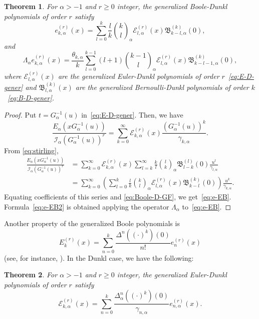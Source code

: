 \documentclass[11pt]{article}
\theoremstyle{plain}
\newtheorem{theorem}{Theorem}[section]
\theoremstyle{remark}
\numberwithin{equation}{section} %
\newcommand{\Ea}{E_{\alpha}}
\newcommand{\La}{\Lambda_{\alpha}}
\newcommand{\binoma}[2]{\binom{#1}{#2}_{\!\alpha}}
\newcommand{\I}{\mathcal{I}}
\newcommand{\B}{\mathfrak{B}}
\newcommand{\E}{\mathcal{E}}
\begin{document}
\begin{theorem}
\label{thm:BD-GED}
For $\alpha>-1$ and $r\ge 0$ integer, the generalized Boole-Dunkl polynomials of order $r$ satisfy
\begin{equation}
\label{eq:e-EB}
  e_{k,\alpha}^{(r)}(x) = \sum_{l=0}^k \frac{l}{k}\binoma{k}{l} 
  \E_{l,\alpha}^{(r)}(x)\B_{k-l,\alpha}^{(k)}(0),
\end{equation}
and
\begin{equation}
\label{eq:e-EB2}
  \La e_{k,\alpha}^{(r)}(x)
  = \frac{\theta_{k,\alpha}}{k} \sum_{l=0}^{k-1} (l+1) \binoma{k-1}{l} 
  \E_{l,\alpha}^{(r)}(x) \B_{k-l-1,\alpha}^{(k)}(0),
\end{equation}
where $\E^{(r)}_{l,\alpha}(x)$ are the generalized Euler-Dunkl polynomials of order $r$~\eqref{eq:E-D-gener} and $\B^{(k)}_{l,\alpha}(x)$ are the generalized Bernoulli-Dunkl polynomials of order $k$~\eqref{eq:B-D-gener}.
\end{theorem}

\begin{proof}
Put $t=G_{\alpha}^{-1}(u)$ in~\eqref{eq:E-D-gener}. Then, we have
\[
  \frac{\Ea(xG_{\alpha}^{-1}(u))}{\I_{\alpha}(G_{\alpha}^{-1}(u))^r}
  = \sum_{k=0}^{\infty} \E_{k,\alpha}^{(r)}(x)\frac{(G_{\alpha}^{-1}(u))^k}{\gamma_{k,\alpha}}.
\]
From \eqref{eq:stirling}, 
\begin{align*}
  \frac{\Ea(xG_{\alpha}^{-1}(u))}{\I_{\alpha}(G_{\alpha}^{-1}(u))^r}
  &= \sum_{k=0}^{\infty} \E_{k,\alpha}^{(r)}(x) 
  \sum_{l=k}^{\infty} \frac{k}{l}\binoma{l}{k}\B_{l-k}^{(l)}(0)\frac{u^l}{\gamma_{l,\alpha}} \\
  &= \sum_{k=0}^{\infty} \left(\sum_{l=0}^k
  \frac{l}{k}\binoma{k}{l}\E_{l,\alpha}^{(r)}(x)\B_{k-l}^{(k)}(0)\right) \frac{u^k}{\gamma_{k,\alpha}}.
\end{align*}
Equating coefficients of this series and \eqref{eq:Boole-D-GF}, we get~\eqref{eq:e-EB}. Formula~\eqref{eq:e-EB2} is obtained applying the operator $\La$ to~\eqref{eq:e-EB}.
\end{proof}

Another property of the generalized Boole polynomials is
\begin{equation*}
  E_k^{(r)}(x) = \sum_{n=0}^{k} \frac{\Delta^n ((\cdot)^k)(0)}{n!}e_n^{(r)}(x)
\end{equation*}
(see, for instance, \cite[(3.21)]{Car}). In the Dunkl case, we have the following:

\begin{theorem}
\label{thm:Ee}
For $\alpha>-1$ and $r\ge 0$ integer, the generalized Euler-Dunkl polynomials of order $r$ satisfy
\begin{equation*}
  \E_{k,\alpha}^{(r)}(x) 
  = \sum_{n=0}^{k} \frac{\Delta_\alpha^n((\cdot)^k)(0)}{\gamma_{n,\alpha}}e_{n,\alpha}^{(r)}(x).
\end{equation*}
\end{theorem}
\end{document}
